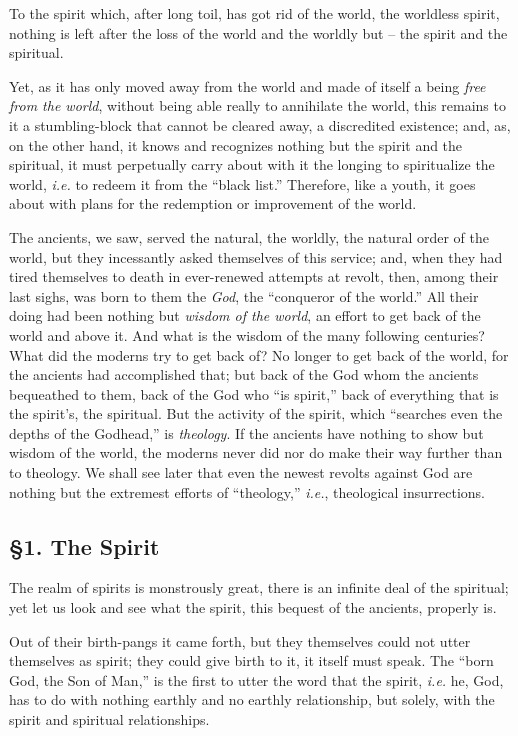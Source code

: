 To the spirit which, after long toil, has got rid of the world, the worldless 
spirit, nothing is left after the loss of the world and the worldly but -- the 
spirit and the spiritual.

Yet, as it has only moved away from the world and made of itself a being 
\textit{free from the world}, without being able really to annihilate the 
world, this remains to it a stumbling-block that cannot be cleared away, a 
discredited existence; and, as, on the other hand, it knows and recognizes 
nothing but the spirit and the spiritual, it must perpetually carry about with 
it the longing to spiritualize the world, \textit{i.e.} to redeem it from the 
``black list.'' Therefore, like a youth, it goes about with plans for the 
redemption or improvement of the world.

The ancients, we saw, served the natural, the worldly, the natural order of 
the world, but they incessantly asked themselves of this service; and, when 
they had tired themselves to death in ever-renewed attempts at revolt, then, 
among their last sighs, was born to them the \textit{God}, the ``conqueror of 
the world.'' All their doing had been nothing but \textit{wisdom of the 
world}, an effort to get back of the world and above it. And what is the 
wisdom of the many following centuries? What did the moderns try to get back 
of? No longer to get back of the world, for the ancients had accomplished 
that; but back of the God whom the ancients bequeathed to them, back of the 
God who ``is spirit,'' back of everything that is the spirit's, the 
spiritual. But the activity of the spirit, which ``searches even the depths 
of the Godhead,'' is \textit{theology}. If the ancients have nothing to show 
but wisdom of the world, the moderns never did nor do make their way further 
than to theology. We shall see later that even the newest revolts against God 
are nothing but the extremest efforts of ``theology,'' \textit{i.e.}, 
theological insurrections.

\subsection[\S{}1. The Spirit]{\centering \S{}1. The Spirit}

The realm of spirits is monstrously great, there is an infinite deal of the 
spiritual; yet let us look and see what the spirit, this bequest of the 
ancients, properly is.

Out of their birth-pangs it came forth, but they themselves could not utter 
themselves as spirit; they could give birth to it, it itself must speak. The 
``born God, the Son of Man,'' is the first to utter the word that the 
spirit, \textit{i.e.} he, God, has to do with nothing earthly and no earthly 
relationship, but solely, with the spirit and spiritual relationships.

